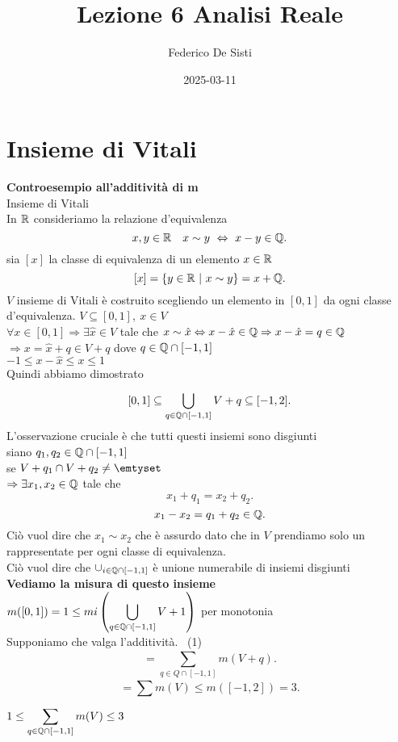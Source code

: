 \documentclass[12px]{article}
\title{Lezione 6 Analisi Reale}
\date{2025-03-11}
\author{Federico De Sisti}
\begin{document}
	\maketitle
	\newpage
	\section{Insieme di Vitali}
	\textbf{Controesempio all'additività di m}\\
	Insieme di Vitali\\
	In $\mathbb{R}$ consideriamo la relazione d'equivalenza
	\[
	x,y\in\R \ \ \ x\sim y \ \Leftrightarrow \ x-y\in\Q
	.\] 
	sia $[x]$ la classe di equivalenza di un elemento $x\in \mathbb{R}$\\
	 \[
		 [x] = \{y\in \mathbb{R} \ | \ x\sim y\} = x + \mathbb{Q}
	.\] 
	$V$ insieme di Vitali è costruito scegliendo un elemento in $[0,1]$ da ogni classe d'equivalenza.  $V\subseteq[0,1], \ x\in V$ \\
	$\forall x\in[0,1] \Rightarrow \exists \hat x\in V$ tale che $x\sim \hat x \Leftrightarrow x-\hat x \in \mathbb{Q} \Rightarrow x - \hat x = q\in\mathbb{Q}$ \\
	$ \Rightarrow x=\hat x + q\in V + q$ dove $q\in\mathbb{Q}\cap [-1,1]$\\
	 $-1\leq x - \hat x \leq x\leq 1$ \\
	 Quindi abbiamo dimostrato
	 \[
		 [0,1]\subseteq \bigcup^{}_{q\in\mathbb{Q}\cap[-1,1]} V + q\subseteq[-1,2]
	 .\] 
	 L'osservazione cruciale è che tutti questi insiemi sono disgiunti\\
	 siano $q_1,q_2\in \mathbb{Q}\cap [-1,1]$\\
	 se $V+ q_1\cap V + q_2\neq \emtyset$\\
	 $ \Rightarrow \exists x_1,x_2\in\mathbb{Q} $ tale che 
	 \[
	 x_1 + q_1 =x_2 + q_2
	 .\] 
	 \[
	 x_1 -x_2 = q_1 + q_2\in\mathbb{Q}
	 .\] 
	 Ciò vuol dire che $x_1\sim x_2$ che è assurdo dato che in $V$ prendiamo solo un rappresentate per ogni classe di equivalenza.\\
	 Ciò vuol dire che $\cup_{i\in\mathbb{Q}\cap[-1,1]}$ è unione numerabile di insiemi disgiunti\\
	  \textbf{Vediamo la misura di questo insieme}\\
	  $\displaystyle m([0,1]) = 1 \leq mi \left(\bigcup_{q\in\mathbb{Q}\cap[-1,1]}V + 1 \right)$ per monotonia\\
	  Supponiamo che valga l'additività. \ \hfill (1)
	  \[
		  = \sum^{}_{q\in Q\cap[-1, 1]}m (V + q)
	  .\] 
	  \[
		  = \sum^{}_{} m(V) \leq m([-1,2]) = 3
	  .\] 
	  $\displaystyle 1 \leq \sum^{}_{q\in\mathbb{Q}\cap[-1,1]}m(V)\leq 3$ \\
\end{document}

